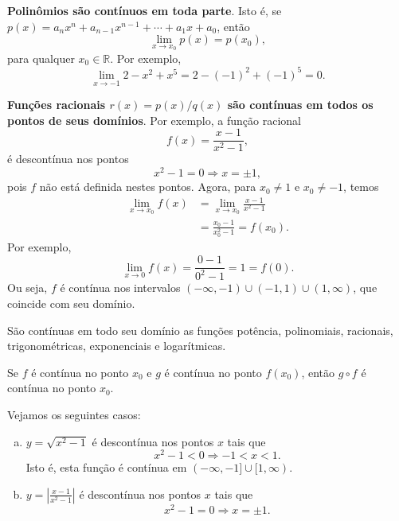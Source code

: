 \begin{ex}
  {\bf Polinômios são contínuos em toda parte}. Isto é, se $p(x) = a_nx^n+a_{n-1}x^{n-1}+\cdots+a_1x+a_0$, então
  \begin{equation}
    \lim_{x\to x_0} p(x) = p(x_0),
  \end{equation}
  para qualquer $x_0\in\mathbb{R}$. Por exemplo,
  \begin{equation}
    \lim_{x\to -1} 2 - x^2 + x^5 = 2 - (-1)^2 + (-1)^5 = 0.
  \end{equation}
\end{ex}

\begin{ex}
  {\bf Funções racionais $r(x) = p(x)/q(x)$ são contínuas em todos os pontos de seus domínios}. Por exemplo, a função racional
  \begin{equation}
    f(x) = \frac{x-1}{x^2-1},
  \end{equation}
  é descontínua nos pontos
  \begin{equation}
    x^2-1 = 0 \Rightarrow x = \pm 1,
  \end{equation}
  pois $f$ não está definida nestes pontos. Agora, para $x_0\neq 1$ e $x_0\neq -1$, temos
  \begin{align}
    \lim_{x\to x_0} f(x) &= \lim_{x\to x_0} \frac{x-1}{x^2-1}\\
                         &= \frac{x_0-1}{x_0^2-1} = f(x_0).
  \end{align}
  Por exemplo,
  \begin{equation}
    \lim_{x\to 0} f(x) = \frac{0-1}{0^2-1} = 1 = f(0).
  \end{equation}
  Ou seja, $f$ é contínua nos intervalos $(-\infty, -1) \cup (-1, 1) \cup (1, \infty)$, que coincide com seu domínio.
\end{ex}

\begin{obs}
  São contínuas em todo seu domínio as funções potência, polinomiais, racionais, trigonométricas, exponenciais e logarítmicas.
\end{obs}

\begin{prop}
  Se $f$ é contínua no ponto $x_0$ e $g$ é contínua no ponto $f(x_0)$, então $g\circ f$ é contínua no ponto $x_0$.
\end{prop}

\begin{ex}
  Vejamos os seguintes casos:
  \begin{enumerate}[a)]
  \item $y = \sqrt{x^2-1}$ é descontínua nos pontos $x$ tais que
    \begin{equation}
      x^2-1<0\Rightarrow -1<x<1.
    \end{equation}
    Isto é, esta função é contínua em $(-\infty,-1]\cup[1,\infty)$.
  \item $\displaystyle y = \left|\frac{x-1}{x^2-1}\right|$ é descontínua nos pontos $x$ tais que
    \begin{equation}
      x^2-1=0\Rightarrow x=\pm 1.
    \end{equation}
  \end{enumerate}
\end{ex}

